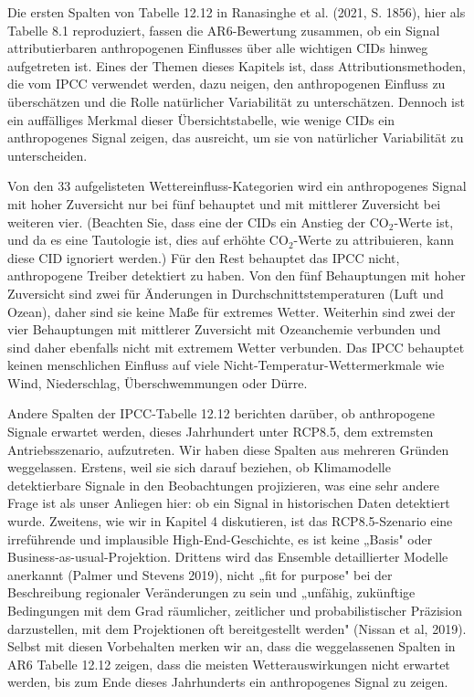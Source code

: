 \documentclass[12pt,paper=a4,DIV=12,parskip=never,chapterprefix=false,headings=standardclasses]{scrreprt}
\begin{document}
Die ersten Spalten von Tabelle 12.12 in Ranasinghe et al. (2021, S. 1856), hier als Tabelle 8.1 reproduziert, fassen die AR6-Bewertung zusammen, ob ein Signal attributierbaren anthropogenen Einflusses über alle wichtigen CIDs hinweg aufgetreten ist. Eines der Themen dieses Kapitels ist, dass Attributionsmethoden, die vom IPCC verwendet werden, dazu neigen, den anthropogenen Einfluss zu überschätzen und die Rolle natürlicher Variabilität zu unterschätzen. Dennoch ist ein auffälliges Merkmal dieser Übersichtstabelle, wie wenige CIDs ein anthropogenes Signal zeigen, das ausreicht, um sie von natürlicher Variabilität zu unterscheiden.

Von den 33 aufgelisteten Wettereinfluss-Kategorien wird ein anthropogenes Signal mit hoher Zuversicht nur bei fünf behauptet und mit mittlerer Zuversicht bei weiteren vier. (Beachten Sie, dass eine der CIDs ein Anstieg der CO$_2$-Werte ist, und da es eine Tautologie ist, dies auf erhöhte CO$_2$-Werte zu attribuieren, kann diese CID ignoriert werden.) Für den Rest behauptet das IPCC nicht, anthropogene Treiber detektiert zu haben. Von den fünf Behauptungen mit hoher Zuversicht sind zwei für Änderungen in Durchschnittstemperaturen (Luft und Ozean), daher sind sie keine Maße für extremes Wetter. Weiterhin sind zwei der vier Behauptungen mit mittlerer Zuversicht mit Ozeanchemie verbunden und sind daher ebenfalls nicht mit extremem Wetter verbunden. Das IPCC behauptet keinen menschlichen Einfluss auf viele Nicht-Temperatur-Wettermerkmale wie Wind, Niederschlag, Überschwemmungen oder Dürre.

Andere Spalten der IPCC-Tabelle 12.12 berichten darüber, ob anthropogene Signale erwartet werden, dieses Jahrhundert unter RCP8.5, dem extremsten Antriebsszenario, aufzutreten. Wir haben diese Spalten aus mehreren Gründen weggelassen. Erstens, weil sie sich darauf beziehen, ob Klimamodelle detektierbare Signale in den Beobachtungen projizieren, was eine sehr andere Frage ist als unser Anliegen hier: ob ein Signal in historischen Daten detektiert wurde. Zweitens, wie wir in Kapitel 4 diskutieren, ist das RCP8.5-Szenario eine irreführende und implausible High-End-Geschichte, es ist keine „Basis" oder Business-as-usual-Projektion. Drittens wird das Ensemble detaillierter Modelle anerkannt (Palmer und Stevens 2019), nicht „fit for purpose" bei der Beschreibung regionaler Veränderungen zu sein und „unfähig, zukünftige Bedingungen mit dem Grad räumlicher, zeitlicher und probabilistischer Präzision darzustellen, mit dem Projektionen oft bereitgestellt werden" (Nissan et al, 2019). Selbst mit diesen Vorbehalten merken wir an, dass die weggelassenen Spalten in AR6 Tabelle 12.12 zeigen, dass die meisten Wetterauswirkungen nicht erwartet werden, bis zum Ende dieses Jahrhunderts ein anthropogenes Signal zu zeigen.
\end{document}
